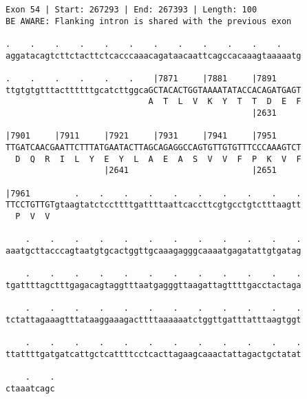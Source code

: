 \documentclass{article}
\begin{document}
\begin{Verbatim}
Exon 54 | Start: 267293 | End: 267393 | Length: 100
BE AWARE: Flanking intron is shared with the previous exon
 
.    .    .    .    .    .    .    .    .    .    .    .    
aggatacagtcttctacttctcacccaaacagataacaattcagccacaaagtaaaaatg
  
.    .    .    .    .    .    |7871     |7881     |7891     
ttgtgtgtttacttttttgcatcttggcaGCTACACTGGTAAAATATACCACAGATGAGT
                             A  T  L  V  K  Y  T  T  D  E  F
                                                  |2631     
  
|7901     |7911     |7921     |7931     |7941     |7951     
TTGATCAACGAATTCTTTATGAATACTTAGCAGAGGCCAGTGTTGTGTTTCCCAAAGTCT
  D  Q  R  I  L  Y  E  Y  L  A  E  A  S  V  V  F  P  K  V  F
                    |2641                         |2651     
  
|7961         .    .    .    .    .    .    .    .    .    .
TTCCTGTTGTgtaagtatctccttttgattttaattcaccttcgtgcctgtctttaagtt
  P  V  V                                                   
  
    .    .    .    .    .    .    .    .    .    .    .    .
aaatgcttacccagtaatgtgcactggttgcaaagagggcaaaatgagatattgtgatag
  
    .    .    .    .    .    .    .    .    .    .    .    .
tgattttagctttgagacagtaggtttaatgagggttaagattagttttgacctactaga
  
    .    .    .    .    .    .    .    .    .    .    .    .
tctattagaaagtttataaggaaagacttttaaaaaatctggttgatttatttaagtggt
  
    .    .    .    .    .    .    .    .    .    .    .    .
ttattttgatgatcattgctcattttcctcacttagaagcaaactattagactgctatat
  
    .    .
ctaaatcagc
\end{Verbatim}
\newpage
\end{document}
